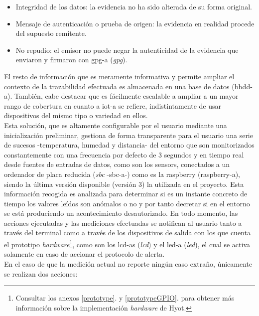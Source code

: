 \documentclass[12pt,a4paper, twoside]{report}
\begin{document}
	\begin{itemize}
		\item Integridad de los datos: la evidencia no ha sido alterada de su forma original.
		\item Mensaje de autenticación o prueba de origen: la evidencia en realidad procede del supuesto remitente.
		\item No repudio: el emisor no puede negar la autenticidad de la evidencia que enviaron y firmaron con \gls{gpg-a} (\textit{\gls{gpg}}).
	\end{itemize}
		
	El resto de información que es meramente informativa y permite ampliar el contexto de la trazabilidad efectuada es almacenada en una base de datos (\gls{bbdd-a}). También, cabe destacar que es fácilmente escalable a ampliar a un mayor rango de cobertura en cuanto a \gls{iot-a} se refiere, indistintamente de usar dispositivos del mismo tipo o variedad en ellos. \\
	
	Esta solución, que es altamente configurable por el usuario mediante una inicialización preliminar, gestiona de forma transparente para el usuario una serie de sucesos -temperatura, humedad y distancia- del entorno que son monitorizados constantemente con una frecuencia por defecto de 3 segundos y en tiempo real desde fuentes de entradas de datos, como son los \glspl{sensor}, conectados a un ordenador de placa reducida (\textit{\gls{sbc}} -\gls{sbc-a}-) como es la \gls{raspberry} (\gls{raspberry-a}), siendo la última versión disponible (versión 3) la utilizada en el proyecto. Esta información recogida es analizada para determinar si es un instante concreto de tiempo los valores leídos son anómalos o no y por tanto decretar si en el entorno se está produciendo un acontecimiento desautorizado. En todo momento, las acciones ejecutadas y las mediciones efectuadas se notifican al usuario tanto a través del terminal como a través de los dispositivos de salida con los que cuenta el \gls{prototipo} \textit{hardware}\footnote{Consultar los anexos \ref{prototype}.  y \ref{prototypeGPIO}.  para obtener más información sobre la implementación \textit{hardware} de Hyot.}, como son los \glspl{lcd-a} (\textit{\gls{lcd}}) y el \gls{led-a} (\textit{\gls{led}}), el cual se activa solamente en caso de accionar el protocolo de alerta. \\		 
			
	En el caso de que la medición actual no reporte ningún caso extraño, únicamente se realizan dos acciones: 
	
\end{document}
